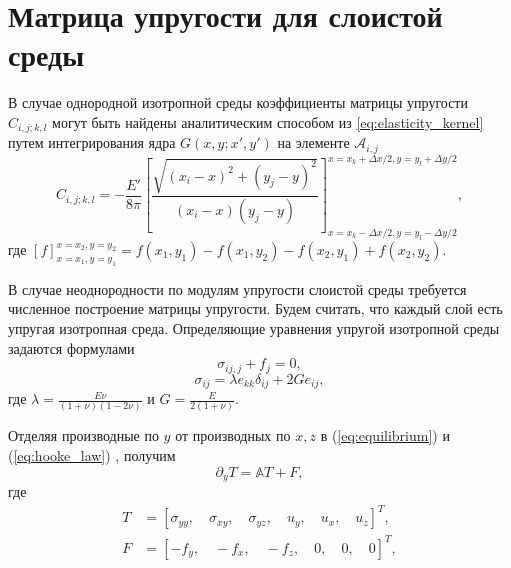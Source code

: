 \chapter{Матрица упругости для слоистой среды}
\label{sec:layered_elasticity}

В случае однородной изотропной среды коэффициенты матрицы упругости $C_{i,j;k,l}$ могут быть найдены аналитическим способом из \eqref{eq:elasticity_kernel} путем интегрирования ядра $G(x,y;x',y')$ на элементе $\mathcal{A}_{i,j}$ \cite{Peir2008}
\begin{equation}
    \label{eq:homogeneous_matrix}
    C_{i,j;k,l} = -\frac{E'}{8\pi} \left[\frac{\sqrt{(x_i\!-\!x)^2 + (y_j\!-\!y)^2}}{(x_i\!-\!x)(y_j\!-\!y)} \right]_{x=x_k-\Delta x/2, y=y_l-\Delta y/2}^{x=x_k+\Delta x/2, y=y_l+\Delta y/2},
\end{equation}
где $[f]_{x=x_1, y=y_1}^{x=x_2, y=y_2} = f(x_1,y_1) - f(x_1,y_2) - f(x_2,y_1) + f(x_2,y_2)$.

В случае неоднородности по модулям упругости слоистой среды требуется численное построение матрицы упругости. Будем считать, что каждый слой есть упругая изотропная среда. Определяющие уравнения упругой изотропной среды задаются формулами
\begin{equation}
    \label{eq:equilibrium}
    \sigma_{ij,j} + f_j = 0,
\end{equation}
\begin{equation}		
    \sigma_{ij} = \lambda e_{kk}\delta_{ij} + 2G e_{ij},
    \label{eq:hooke_law}
\end{equation}
где $\lambda = \frac{E \nu}{(1+\nu)(1-2\nu)}$ и $ G = \frac{E}{2(1+\nu)} $.

Отделяя производные по $y$ от производных по $x, z$ в (\ref{eq:equilibrium}) и (\ref{eq:hooke_law}) \cite{Siebrits_Peirce_2002,Peirce2001TheSF,Peirce2001UniformAA}, получим
\begin{equation}
    \label{eq:separate}
    \partial_{y} T = \mathbb{A}T + F,
\end{equation}
где
\begin{equation}
    \label{eq:T}
    \begin{split}
        T &= \left[\sigma_{yy} , \quad \sigma_{xy} , \quad \sigma_{yz} , \quad u_{y} , \quad u_{x} , \quad u_{z}\right]^T, \\
        F &= \left[-f_y , \quad -f_x , \quad -f_z , \quad 0 , \quad 0 , \quad 0\right]^T,
    \end{split}
\end{equation}

